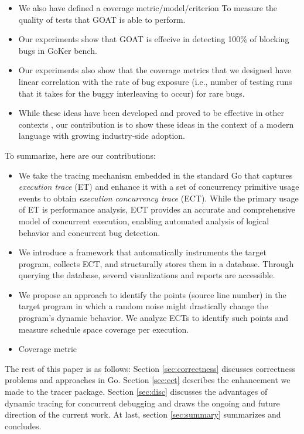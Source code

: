 \begin{itemize}
  \item We also have defined a coverage metric/model/criterion To measure the quality of tests that GOAT is able to perform.
  \item Our experiments show that GOAT is effecive in detecting 100\% of blocking bugs in GoKer bench.
  \item Our experiments also show that the coverage metrics that we designed have linear correlation with the rate of bug exposure (i.e., number of testing runs that it takes for the buggy interleaving to occur) for rare bugs.
  \item While these ideas have been developed and proved to be effective in other contexts \cite{burckhardt-depthBug-asplos10,emmi-delayBounded-popl11,madanlal-preemptionBound-pldi07}, our contribution is to show these ideas in the context of a modern language with growing industry-side adoption.
\end{itemize}


To summarize, here are our contributions:
\begin{itemize}
    \item We take the tracing mechanism embedded in the standard Go that captures \textit{execution trace} (ET) and enhance it with a set of concurrency primitive usage events to obtain \textit{execution concurrency trace} (ECT). While the primary usage of ET is performance analysis, ECT provides an accurate and comprehensive model of concurrent execution, enabling automated analysis of logical behavior and concurrent bug detection.
    \item We introduce a framework that automatically instruments the target program, collects ECT, and structurally stores them in a database. Through querying the database, several visualizations and reports are accessible.
    \item We propose an approach to identify the points (\ie source line number) in the target program in which a random noise might drastically change the program's dynamic behavior. We analyze ECTs to identify such points and measure schedule space coverage per execution.
    \item Coverage metric
\end{itemize}
The rest of this paper is as follows: Section \ref{sec:correctness} discusses correctness problems and approaches in Go. Section \ref{sec:ect} describes the enhancement we made to the tracer package. Section \ref{sec:disc} discusses the advantages of dynamic tracing for concurrent debugging and draws the ongoing and future direction of the current work. At last, section \ref{sec:summary} summarizes and concludes.

